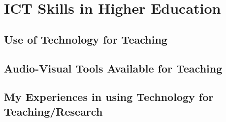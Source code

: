 \chapter{ICT Skills in Higher Education}
\section{Use of Technology for Teaching}
\section{Audio-Visual Tools Available for Teaching}
\section{My Experiences in using Technology for Teaching/Research}

